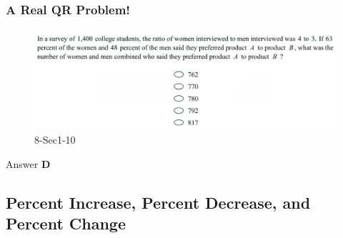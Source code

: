 \documentclass[
	11pt, %
]{beamer}
\begin{document}

\begin{frame}
	\frametitle{A Real QR Problem!}
	\framesubtitle{}
	\begin{figure}
		\includegraphics[width=\linewidth]{Percent_Example_Question_1.png}
		\caption{8-Sec1-10}
	\end{figure}
	\pause

\pause
\bigskip
Answer \textbf{D}
\end{frame}


\subsection{Percent Increase, Percent Decrease, and Percent Change}









\end{document}
